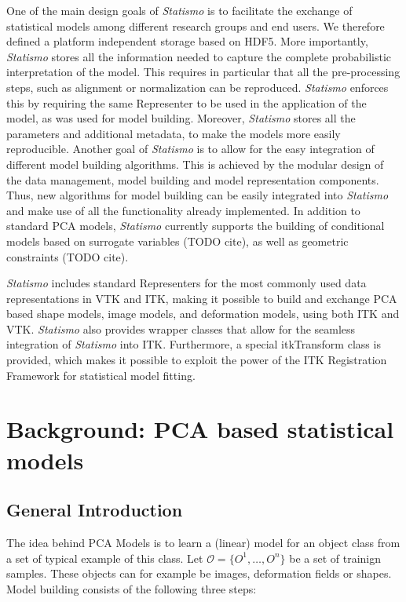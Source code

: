 \documentclass{InsightArticle}
\newcommand{\Statismo}{\emph{Statismo}\xspace}
\begin{document}
One of the main design goals of \Statismo is to facilitate the exchange of
statistical models among different research groups and end users. We therefore
defined a platform independent storage based on HDF5. More importantly, \Statismo stores all the 
information needed to capture the complete probabilistic interpretation of the model.
This requires in particular that all the pre-processing steps, such as alignment or normalization 
can be reproduced. \Statismo enforces this by requiring the same Representer to be used 
in the application of the model, as was used for model building. Moreover, \Statismo stores
all the parameters and additional metadata, to make the models more easily reproducible. 
Another goal of \Statismo is to allow for the easy integration of
different model building algorithms. This is achieved by the modular design of the data management, model building and model representation components. Thus, new algorithms for model building can be easily
integrated into \Statismo and make use of all the functionality
already implemented.  In addition to  standard PCA models, \Statismo
currently supports the building of conditional models based on surrogate
variables (TODO cite), as well as geometric constraints (TODO cite).

\Statismo includes standard Representers for the most commonly used
data representations in VTK and ITK, making it possible to build and
exchange PCA based shape models, image models, and deformation models,
using both ITK and VTK. \Statismo also provides wrapper classes that
allow for the seamless integration of \Statismo into ITK. Furthermore,
a special itkTransform class is provided, which makes it possible 
to exploit the power of the  ITK Registration Framework for
statistical model fitting.


\section{Background: PCA based statistical models}
\subsection{General Introduction}\label{sec:pca-models}
The idea behind PCA Models is to learn a (linear) model for an object class from a set of
typical example of this class. Let $\mathcal{O} = \{O^1, \ldots,
O^n\}$ be a set of trainign samples. These
objects can for example be images, deformation fields or shapes. Model
building consists of the following three steps:
\end{document}
